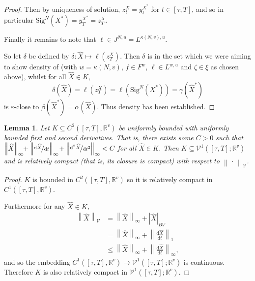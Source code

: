 \documentclass{article}
\theoremstyle{plain}
\newtheorem{lemma}[thm]{Lemma}
\theoremstyle{definition}
\newcommand{\norm}[1]{\left\|#1\right\|}
\newcommand{\abs}[1]{\left|#1\right|}
\newcommand{\reals}{\mathbb{R}}
\newcommand{\ttfrac}[2]{\nicefrac{#1}{#2}}
\begin{document}
\begin{proof}
	Then by uniqueness of solution, $z^{X}_t = y^{X^*}_t$ for $t \in [\tau, T]$, and so in particular $\mathrm{Sig}^N(X^*) = y^{X^*}_T = z^{X}_T$.
	
	Finally it remains to note that $\ell \in J^{N, u} = L^{\kappa(N, v), u}$.
	
	So let $\delta$ be defined by $\delta \colon \widehat{X} \mapsto \ell(z^X_T)$. Then $\delta$ is in the set which we were aiming to show density of (with $w = \kappa(N, v)$, $f \in F^w$, $\ell \in L^{w, u}$ and $\zeta \in \xi$ as chosen above), whilst for all $\widehat{X} \in K$,
	\begin{equation*}
	\delta(\widehat{X}) = \ell(z^X_T) = \ell(\mathrm{Sig}^N(X^*)) = \gamma(\widehat{X}^*)
	\end{equation*}
	is $\varepsilon$-close to $\beta(\widehat{X}^*) = \alpha(\widehat{X})$. Thus density has been established.
	\end{proof}
	
	\begin{lemma}\label{lemma:compact}
	Let $K \subseteq C^2([\tau, T], \reals^v)$ be uniformly bounded with uniformly bounded first and second derivatives. That is, there exists some $C > 0$ such that $\norm{\widehat{X}}_\infty \!\!+ \norm{\ttfrac{\mathrm{d}\widehat{X}}{\mathrm{d}t}}_\infty \!+ \norm{\ttfrac{\mathrm{d}^2\widehat{X}}{\mathrm{d}t^2}}_\infty< C$ for all $\widehat{X} \in K$. Then $K \subseteq \mathcal{V}^1([\tau, T]; \reals^v)$ and is relatively compact (that is, its closure is compact) with respect to $\norm{\,\cdot\,}_\mathcal{V}$.
	\end{lemma}
	\begin{proof}
	$K$ is bounded in $C^2([\tau, T], \reals^v)$ so it is relatively compact in $C^1([\tau, T], \reals^v)$.
	
	Furthermore for any $\widehat{X} \in K$,
	\begin{align*}
	\norm{\widehat{X}}_\mathcal{V} &= \norm{\widehat{X}}_{\infty} + \abs{\widehat{X}}_{BV}\\
	&= \norm{\widehat{X}}_{\infty} + \norm{\frac{\mathrm{d}\widehat{X}}{\mathrm{d}t}}_1\\
	&\leq \norm{\widehat{X}}_{\infty} + \norm{\frac{\mathrm{d}\widehat{X}}{\mathrm{d}t}}_\infty,
	\end{align*}
	and so the embedding $C^1([\tau, T], \reals^v) \to \mathcal{V}^1([\tau, T]; \reals^v)$ is continuous. Therefore $K$ is also relatively compact in $\mathcal{V}^1([\tau, T]; \reals^v)$.
	\end{proof}
	
\end{document}
